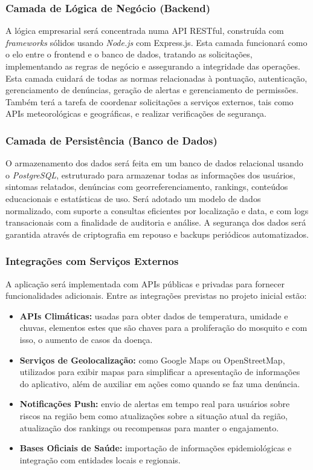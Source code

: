 \documentclass[a4paper, 12pt]{article}
\begin{document}
\subsubsection{Camada de Lógica de Negócio (Backend)}

A lógica empresarial será concentrada numa API RESTful, construída com \textit{frameworks} sólidos usando \textit{Node.js} com Express.js. Esta camada funcionará como o elo entre o frontend e o banco de dados, tratando as solicitações, implementando as regras de negócio e assegurando a integridade das operações.
Esta camada cuidará de todas as normas relacionadas à pontuação, autenticação, gerenciamento de denúncias, geração de alertas e gerenciamento de permissões.  Também terá a tarefa de coordenar solicitações a serviços externos, tais como APIs meteorológicas e geográficas, e realizar verificações de segurança.

\subsubsection{Camada de Persistência (Banco de Dados)}

O armazenamento dos dados será feita em um banco de dados relacional usando o  \textit{PostgreSQL}, estruturado para armazenar todas as informações dos usuários, sintomas relatados, denúncias com georreferenciamento, rankings, conteúdos educacionais e estatísticas de uso.
Será adotado um modelo de dados normalizado, com suporte a consultas eficientes por localização e data, e com logs transacionais com a finalidade de auditoria e análise. A segurança dos dados será garantida através de criptografia em repouso e backups periódicos automatizados.

\subsubsection{Integrações com Serviços Externos}

A aplicação será implementada com APIs públicas e privadas para fornecer funcionalidades adicionais. Entre as integrações previstas no projeto inicial estão:

\begin{itemize}
    \item \textbf{APIs Climáticas:} usadas para obter dados de temperatura, umidade e chuvas, elementos estes que são chaves para a proliferação do mosquito e com isso, o aumento de casos da doença.
    \item \textbf{Serviços de Geolocalização:} como Google Maps ou OpenStreetMap, utilizados para exibir mapas para simplificar a apresentação de informações do aplicativo, além de auxiliar em ações como quando se faz uma denúncia.
    \item \textbf{Notificações Push:} envio de alertas em tempo real para usuários sobre riscos na região bem como atualizações sobre a situação atual da região, atualização dos rankings ou recompensas para manter o engajamento.
    \item \textbf{Bases Oficiais de Saúde:} importação de informações epidemiológicas e integração com entidades locais e regionais.
\end{itemize}
\end{document}
